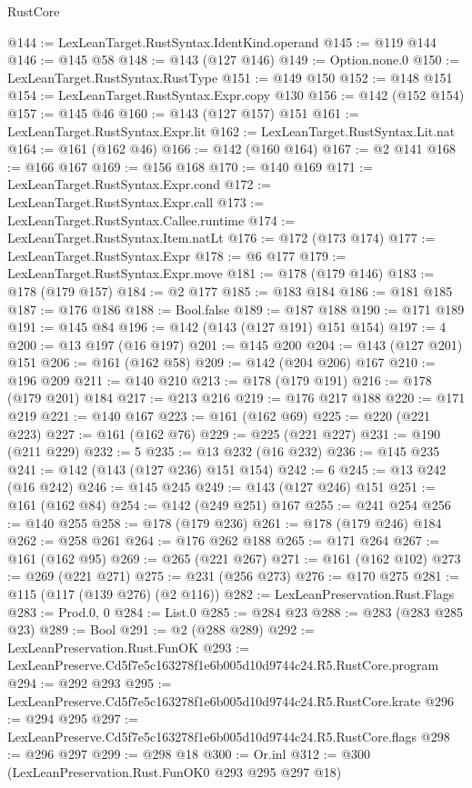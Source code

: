 \begin{lexlean}{RustCore}
\begin{coremodule}
@144 := LexLeanTarget.RustSyntax.IdentKind.operand
@145 := @119 @144
@146 := @145 @58
@148 := @143 (@127 @146)
@149 := Option.none.{0}
@150 := LexLeanTarget.RustSyntax.RustType
@151 := @149 @150
@152 := @148 @151
@154 := LexLeanTarget.RustSyntax.Expr.copy @130
@156 := @142 (@152 @154)
@157 := @145 @46
@160 := @143 (@127 @157) @151
@161 := LexLeanTarget.RustSyntax.Expr.lit
@162 := LexLeanTarget.RustSyntax.Lit.nat
@164 := @161 (@162 @46)
@166 := @142 (@160 @164)
@167 := @2 @141
@168 := @166 @167
@169 := @156 @168
@170 := @140 @169
@171 := LexLeanTarget.RustSyntax.Expr.cond
@172 := LexLeanTarget.RustSyntax.Expr.call
@173 := LexLeanTarget.RustSyntax.Callee.runtime
@174 := LexLeanTarget.RustSyntax.Item.natLt
@176 := @172 (@173 @174)
@177 := LexLeanTarget.RustSyntax.Expr
@178 := @6 @177
@179 := LexLeanTarget.RustSyntax.Expr.move
@181 := @178 (@179 @146)
@183 := @178 (@179 @157)
@184 := @2 @177
@185 := @183 @184
@186 := @181 @185
@187 := @176 @186
@188 := Bool.false
@189 := @187 @188
@190 := @171 @189
@191 := @145 @84
@196 := @142 (@143 (@127 @191) @151 @154)
@197 := 4
@200 := @13 @197 (@16 @197)
@201 := @145 @200
@204 := @143 (@127 @201) @151
@206 := @161 (@162 @58)
@209 := @142 (@204 @206) @167
@210 := @196 @209
@211 := @140 @210
@213 := @178 (@179 @191)
@216 := @178 (@179 @201) @184
@217 := @213 @216
@219 := @176 @217 @188
@220 := @171 @219
@221 := @140 @167
@223 := @161 (@162 @69)
@225 := @220 (@221 @223)
@227 := @161 (@162 @76)
@229 := @225 (@221 @227)
@231 := @190 (@211 @229)
@232 := 5
@235 := @13 @232 (@16 @232)
@236 := @145 @235
@241 := @142 (@143 (@127 @236) @151 @154)
@242 := 6
@245 := @13 @242 (@16 @242)
@246 := @145 @245
@249 := @143 (@127 @246) @151
@251 := @161 (@162 @84)
@254 := @142 (@249 @251) @167
@255 := @241 @254
@256 := @140 @255
@258 := @178 (@179 @236)
@261 := @178 (@179 @246) @184
@262 := @258 @261
@264 := @176 @262 @188
@265 := @171 @264
@267 := @161 (@162 @95)
@269 := @265 (@221 @267)
@271 := @161 (@162 @102)
@273 := @269 (@221 @271)
@275 := @231 (@256 @273)
@276 := @170 @275
@281 := @115 (@117 (@139 @276) (@2 @116))
@282 := LexLeanPreservation.Rust.Flags
@283 := Prod.{0, 0}
@284 := List.{0}
@285 := @284 @23
@288 := @283 (@283 @285 @23)
@289 := Bool
@291 := @2 (@288 @289)
@292 := LexLeanPreservation.Rust.FunOK
@293 := LexLeanPreserve.Cd5f7e5c163278f1e6b005d10d9744c24.R5.RustCore.program
@294 := @292 @293
@295 := LexLeanPreserve.Cd5f7e5c163278f1e6b005d10d9744c24.R5.RustCore.krate
@296 := @294 @295
@297 := LexLeanPreserve.Cd5f7e5c163278f1e6b005d10d9744c24.R5.RustCore.flags
@298 := @296 @297
@299 := @298 @18
@300 := Or.inl
@312 := @300
    (LexLeanPreservation.Rust.FunOK0 @293 @295 @297 @18)

\end{coremodule}
\end{lexlean}
